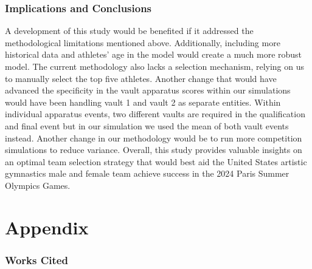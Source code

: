 \documentclass[
  10.5pt,
  letterpaper,
  DIV=11,
  numbers=noendperiod]{scrartcl}
\begin{document}
\hypertarget{implications-and-conclusions}{%
\subsubsection{Implications and
Conclusions}\label{implications-and-conclusions}}

A development of this study would be benefited if it addressed the
methodological limitations mentioned above. Additionally, including more
historical data and athletes' age in the model would create a much more
robust model. The current methodology also lacks a selection mechanism,
relying on us to manually select the top five athletes. Another change
that would have advanced the specificity in the vault apparatus scores
within our simulations would have been handling vault 1 and vault 2 as
separate entities. Within individual apparatus events, two different
vaults are required in the qualification and final event but in our
simulation we used the mean of both vault events instead. Another change
in our methodology would be to run more competition simulations to
reduce variance. Overall, this study provides valuable insights on an
optimal team selection strategy that would best aid the United States
artistic gymnastics male and female team achieve success in the 2024
Paris Summer Olympics Games.

\newpage

\hypertarget{appendix}{%
\section{Appendix}\label{appendix}}

\hypertarget{works-cited}{%
\subsubsection{Works Cited}\label{works-cited}}
\end{document}
